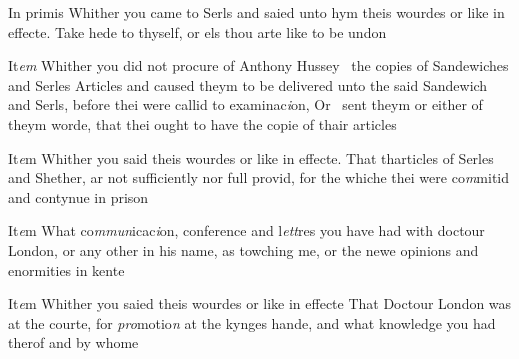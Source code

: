 \documentclass[12pt, a4paper]{book}
\begin{document}
				\marginpar[\vspace{0.5cm}{\textcolor{Gray}{n}}]{}
			
		\ifthenelse{\isodd{\thepage}}
		{\reversemarginpar}
		{\normalmarginpar}
		
            			In primis Whither you came to Serls and saied unto hym
 theis wourdes or like in effecte. Take hede to thyself, or
 els thou arte like to be undon
            		
            		
				\marginpar[\vspace{0.5cm}{\textcolor{Gray}{n}}]{}
			
		\ifthenelse{\isodd{\thepage}}
		{\reversemarginpar}
		{\normalmarginpar}
		 It\textit{em} Whither you did not procure of Anthony Hussey 
            			the copies of Sandewiches and Serles Articles and
            			caused theym to be delivered unto the said Sandewich
            			and Serls, before thei were callid to examinac\textit{i}on, Or 
 sent theym or either of theym worde, that thei ought to
 	have the copie of thair articles
			
            		
		\ifthenelse{\isodd{\thepage}}
		{\reversemarginpar}
		{\normalmarginpar}
		It\textit{e}m Whither you said theis wourdes or like in effecte. That
 tharticles of Serles and Shether, ar not sufficiently
 nor full provid, for the whiche thei were co\textit{m}mitid and
 contynue in prison

		\ifthenelse{\isodd{\thepage}}
		{\reversemarginpar}
		{\normalmarginpar}
		It\textit{e}m What co\textit{mmun}icac\textit{i}on, conference and l\textit{ett}res you have had
 with doctour London, or any other in his name, as
 towching me, or the newe opinions and enormities in
 kente
            		
				\marginpar[\vspace{0.5cm}{\textcolor{Gray}{n}}]{}
			
		\ifthenelse{\isodd{\thepage}}
		{\reversemarginpar}
		{\normalmarginpar}
		It\textit{e}m Whither you saied theis wourdes or like in effecte
 That Doctour London was at the courte, for \textit{pro}motio\textit{n}
 at the kynges hande, and what knowledge you had therof
 and by whome
			

            		
				\marginpar[\vspace{0.5cm}{\textcolor{Gray}{n}}]{}
			
\end{document}
